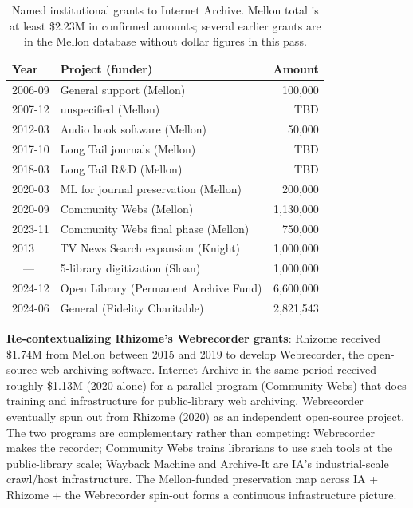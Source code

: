 \documentclass[10pt,letterpaper,twocolumn]{article}
\begin{document}
\begin{table}[h]
\footnotesize
\centering
\begin{tabularx}{\columnwidth}{l>{\raggedright\arraybackslash\hspace{0pt}}Xr}
\toprule
\textbf{Year} & \textbf{Project (funder)} & \textbf{Amount} \\
\midrule
2006-09 & General support (Mellon) & 100,000 \\
2007-12 & unspecified (Mellon) & TBD \\
2012-03 & Audio book software (Mellon) & 50,000 \\
2017-10 & Long Tail journals (Mellon) & TBD \\
2018-03 & Long Tail R\&D (Mellon) & TBD \\
2020-03 & ML for journal preservation (Mellon) & 200,000 \\
2020-09 & Community Webs (Mellon) & 1,130,000 \\
2023-11 & Community Webs final phase (Mellon) & 750,000 \\
\midrule
2013 & TV News Search expansion (Knight) & 1,000,000 \\
~~--- & 5-library digitization (Sloan) & 1,000,000 \\
2024-12 & Open Library (Permanent Archive Fund) & 6,600,000 \\
2024-06 & General (Fidelity Charitable) & 2,821,543 \\
\bottomrule
\end{tabularx}
\caption{Named institutional grants to Internet Archive. Mellon total is at least \$2.23M in confirmed amounts; several earlier grants are in the Mellon database without dollar figures in this pass.}
\label{tab:grants}
\end{table}

\textbf{Re-contextualizing Rhizome's Webrecorder grants}: Rhizome received \$1.74M from Mellon between 2015 and 2019 to develop Webrecorder, the open-source web-archiving software. Internet Archive in the same period received roughly \$1.13M (2020 alone) for a parallel program (Community Webs) that does training and infrastructure for public-library web archiving. Webrecorder eventually spun out from Rhizome (2020) as an independent open-source project. The two programs are complementary rather than competing: Webrecorder makes the recorder; Community Webs trains librarians to use such tools at the public-library scale; Wayback Machine and Archive-It are IA's industrial-scale crawl/host infrastructure. The Mellon-funded preservation map across IA + Rhizome + the Webrecorder spin-out forms a continuous infrastructure picture.
\end{document}
